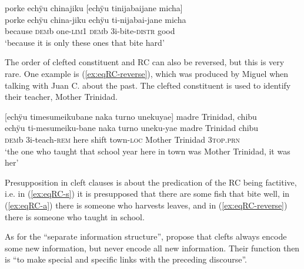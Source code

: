 \ea\label{ex:eqRC-s}
\begingl
\glpreamble porke echÿu chinajiku \textup{[}echÿu tinijabaijane micha\textup{]} \\
\gla porke echÿu china-jiku echÿu ti-nijabai-jane micha\\
\glb because \textsc{dem}b one-\textsc{lim}1 \textsc{dem}b 3i-bite-\textsc{distr} good\\
\glft ‘because it is only these ones that bite hard’
\endgl
\trailingcitation{[cux-c120414ls-2.070]}
\xe

The order of clefted constituent and RC can also be reversed, but this is very rare. One example is (\ref{ex:eqRC-reverse}), which was produced by Miguel when talking with Juan C. about the past. The clefted constituent is used to identify their teacher, Mother Trinidad.

\ea\label{ex:eqRC-reverse}
\begingl
\glpreamble \textup{[}echÿu timesumeikubane naka turno unekuyae\textup{]} madre Trinidad, chibu\\
\gla echÿu ti-mesumeiku-bane naka turno uneku-yae {madre Trinidad} chibu\\
\glb \textsc{dem}b 3i-teach-\textsc{rem} here shift town-\textsc{loc} {Mother Trinidad} 3\textsc{top.prn}\\
\glft ‘the one who taught that school year here in town was Mother Trinidad, it was her’
\endgl
\trailingcitation{[mqx-p110826l.241-24]}
\xe


Presupposition in cleft clauses is about the predication of the RC being factitive, i.e. in (\ref{ex:eqRC-s}) it is presupposed that there are some fish that bite well, in (\ref{ex:eqRC-a}) there is someone who harvests leaves, and in (\ref{ex:eqRC-reverse}) there is someone who taught in school. 

As for the “separate information structure”, \citet[8]{DelinOberlander2005} propose that clefts always encode some new information, but never encode all new information. Their function then is “to make special and specific links with the preceding discourse”.



